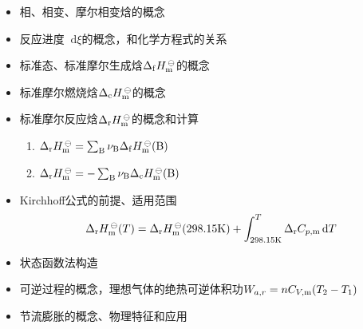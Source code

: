 \documentclass[9pt]{beamer}
\newcommand\B{{\rm B}}
\newcommand*{\dif}{\mathop{}\!\mathrm{d}}
\newcommand\cc{{\rm c}}
\newcommand\f{{\rm f}}
\newcommand\K{{\rm K}}
\newcommand\m{{\rm m}}
\newcommand\rr{{\rm r}}
\begin{document}
	\begin{frame}
	
	\begin{itemize}
	
	\item 相、相变、摩尔相变焓的概念
	
	\item 反应进度$\dif \xi$的概念，和化学方程式的关系
	
	\item 标准态、标准摩尔生成焓$\Delta_\f H^{\,\ominus}_\m$的概念
	
	\item 标准摩尔燃烧焓$\Delta_\cc H^{\,\ominus}_\m$的概念
	
	\item 标准摩尔反应焓$\Delta_\rr H^{\,\ominus}_\m$的概念和计算
		\begin{enumerate}
	
		\item $\Delta_\rr H^{\,\ominus}_\m = \sum_\B \nu_\B \Delta_\f H^{\,\ominus}_\m(\B)$
		
		\item $\Delta_\rr H^{\,\ominus}_\m = - \sum_\B \nu_\B \Delta_\cc H^{\,\ominus}_\m(\B)$
	
		\end{enumerate}
	
	\item Kirchhoff公式的前提、适用范围
	\[
		\Delta_\rr H^{\,\ominus}_\m(T) = \Delta_\rr H^{\,\ominus}_\m( 298.15\K ) + \int_{298.15\K}^T \Delta_\rr C_{p,\m} \dif T
	\]
	
	\item 状态函数法构造
	
	\item 可逆过程的概念，理想气体的绝热可逆体积功$W_{a,r} = nC_{V,\m}(T_2-T_1)$	
	
	\item 节流膨胀的概念、物理特征和应用
	
	\end{itemize}		
	
	\end{frame}
\end{document}
